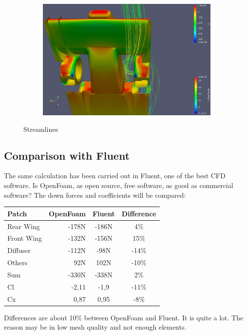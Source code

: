 \begin{figure}[h!]
\begin{subfigure}[b]{0.49\textwidth}
    \end{subfigure}
    \begin{subfigure}[b]{0.49\textwidth}
    	\includegraphics[width=\textwidth]{linie4.jpg}
    \end{subfigure}
    \caption{Streamlines}
   
\end{figure}


\subsection{Comparison with Fluent}
The same calculation has been carried out in Fluent, one of the best CFD software. Is OpenFoam, as open source, free software, as good as commercial software? The down forces and coefficients will be compared:

\begin{tabular}{lr|c|c}
Patch		&	OpenFoam		&	Fluent		&Difference\\\hline
Rear Wing	&-178N				&-186N			&4\%\\
Front Wing	&-132N				&-156N			&15\%\\
Diffuser	&-112N				&-98N			&-14\%\\
Others		&92N				&102N			&-10\%\\\hline
Sum			&-330N				&-338N			&2\%\\\hline\hline
Cl			&-2,11				&-1,9			&-11\%\\
Cx			&0,87				&0,95			&-8\%\\

\end{tabular}

Differences are about 10\% between OpenFoam and Fluent. It is quite a lot. The reason may be in low mesh quality and not enough elements. 